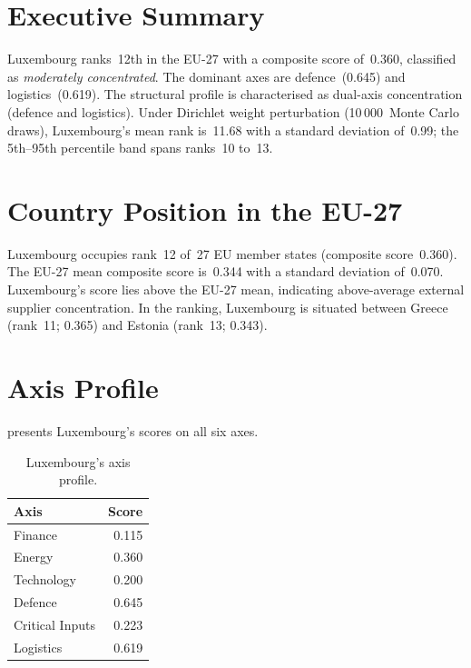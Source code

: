 \documentclass[12pt,a4paper]{article}
\begin{document}
\hypersetup{pageanchor=true}
\pagestyle{fancy}
\renewcommand{\headrulewidth}{0.4pt}


\section{Executive Summary}
\label{sec:summary}

Luxembourg ranks~12th in the EU-27 with a composite \ISI score of~0.360, classified as \emph{moderately concentrated}.  The dominant axes are defence~(0.645) and logistics~(0.619).  The structural profile is characterised as dual-axis concentration (defence and logistics).  Under Dirichlet weight perturbation (10\,000~Monte Carlo draws), Luxembourg's mean rank is~11.68 with a standard deviation of~0.99; the 5th--95th percentile band spans ranks~10 to~13.


\section{Country Position in the EU-27}
\label{sec:position}

Luxembourg occupies rank~12 of~27 EU member states (composite score~0.360).  The EU-27 mean composite score is~0.344 with a standard deviation of~0.070.  Luxembourg's score lies above the EU-27 mean, indicating above-average external supplier concentration.  In the ranking, Luxembourg is situated between Greece (rank~11; 0.365) and Estonia (rank~13; 0.343).


\section{Axis Profile}
\label{sec:axis-profile}

 presents Luxembourg's scores on all six \ISI axes.

\begin{table}[htbp]
\centering\small
\caption{Luxembourg's \ISI axis profile.}
\label{tab:axis-profile}
\begin{tabular}{@{}lr@{}}
\toprule
\textbf{Axis} & \textbf{Score} \\
\midrule
    Finance           & 0.115 \\
    Energy            & 0.360 \\
    Technology        & 0.200 \\
    Defence           & 0.645 \\
    Critical Inputs   & 0.223 \\
    Logistics         & 0.619 \\
\bottomrule
\end{tabular}
\end{table}
\end{document}
